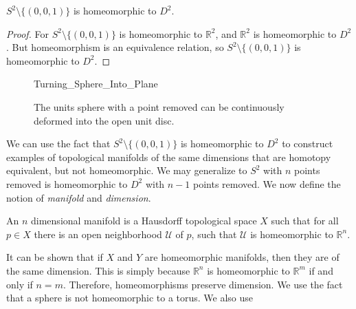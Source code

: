 \documentclass[crop=false,class=book,oneside]{standalone}
\begin{document}
            \begin{theorem}
                $S^{2}\setminus\{(0,0,1)\}$
                is homeomorphic to $D^{2}$.
            \end{theorem}
            \begin{proof}
                For $S^{2}\setminus\{(0,0,1)\}$ is
                homeomorphic to $\mathbb{R}^{2}$, and
                $\mathbb{R}^{2}$ is homeomorphic to $D^{2}$.
                But homeomorphism is an equivalence relation, so
                $S^{2}\setminus\{(0,0,1)\}$
                is homeomorphic to $D^{2}$.
            \end{proof}
            \begin{figure}[H]
                \centering
                \captionsetup{type=figure}
                
                    {Turning_Sphere_Into_Plane}
                \caption[Homeomorphism Between 
                         $S^{2}\setminus\{(0,0,1)\}$ and $D^{2}$.]
                        {The units sphere with a point removed
                         can be continuously deformed into the
                         open unit disc.}
                \label{fig:surgery_theory_homeomorphism_%
                       S_2_wo_North_Pole_and_R_2}
            \end{figure}
            We can use the fact that $S^{2}\setminus \{(0,0,1)\}$
            is homeomorphic to $D^{2}$ to construct examples of
            topological manifolds of the same dimensions that are
            homotopy equivalent, but not homeomorphic. We may
            generalize to $S^{2}$ with $n$ points removed is
            homeomorphic to $D^{2}$ with $n-1$ points removed.
            We now define the notion of
            \textit{manifold} and \textit{dimension}.
            \begin{definition}
                An $n$ dimensional manifold is a Hausdorff
                topological space $X$ such that for all
                $p\in{X}$ there is an open neighborhood
                $\mathcal{U}$ of $p$, such that $\mathcal{U}$
                is homeomorphic to $\mathbb{R}^{n}$.
            \end{definition}
            It can be shown that if $X$ and $Y$ are homeomorphic
            manifolds, then they are of the same dimension.
            This is simply because $\mathbb{R}^{n}$ is homeomorphic
            to $\mathbb{R}^{m}$ if and only if $n=m$. Therefore,
            homeomorphisms preserve dimension. We use the fact that
            a sphere is not homeomorphic to a torus. We also use
\end{document}
